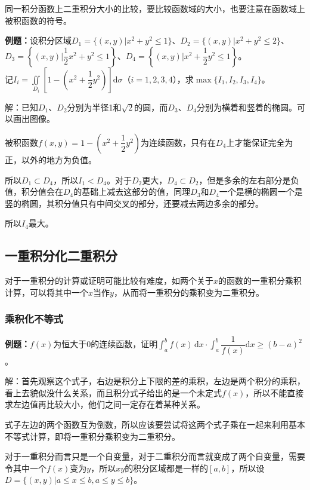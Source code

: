 \documentclass[UTF8, 12pt]{ctexart}
\begin{document}
同一积分函数上二重积分大小的比较，要比较函数域的大小，也要注意在函数域上被积函数的符号。

\textbf{例题：}设积分区域$D_1=\{(x,y)|x^2+y^2\leqslant1\}$、$D_2=\{(x,y)|x^2+y^2\leqslant2\}$、$D_3=\left\{(x,y)|\dfrac{1}{2}x^2+y^2\leqslant1\right\}$、$D_4=\left\{(x,y)|x^2+\dfrac{1}{2}y^2\leqslant1\right\}$。\\记$I_i=\iint\limits_{D_i}\left[1-\left(x^2+\dfrac{1}{2}y^2\right)\right]\textrm{d}\sigma$（$i=1,2,3,4$），求$\max\{I_1,I_2,I_3,I_4\}$。

解：已知$D_1$、$D_2$分别为半径1和$\sqrt{2}$的圆，而$D_3$、$D_4$分别为横着和竖着的椭圆。可以画出图像。

被积函数$f(x,y)=1-\left(x^2+\dfrac{1}{2}y^2\right)$为连续函数，只有在$D_4$上才能保证完全为正，以外的地方为负值。

所以$D_1\subset D_4$，所以$I_1<D_4$。对于$D_2$更大，$D_4\subset D_2$，但是多余的左右部分是负值，积分值会在$D_4$的基础上减去这部分的值，同理$D_3$和$D_4$一个是横的椭圆一个是竖的椭圆，其积分值只有中间交叉的部分，还要减去两边多余的部分。

所以$I_4$最大。

\subsection{一重积分化二重积分}

对于一重积分的计算或证明可能比较有难度，如两个关于$x$的函数的一重积分乘积计算，可以将其中一个$x$当作$y$，从而将一重积分的乘积变为二重积分。

\subsubsection{乘积化不等式}

\textbf{例题：}$f(x)$为恒大于0的连续函数，证明$\displaystyle{\int_a^bf(x)\,\textrm{d}x\cdot\int_a^b\dfrac{1}{f(x)}\textrm{d}x\geqslant(b-a)^2}$。

解：首先观察这个式子，右边是积分上下限的差的乘积，左边是两个积分的乘积，看上去貌似没什么关系，而且积分式子给出的是一个未定式$f(x)$，所以不能直接求左边值再比较大小，他们之间一定存在着某种关系。

式子左边的两个函数互为倒数，所以应该要尝试将这两个式子乘在一起来利用基本不等式计算，即将一重积分乘积变为二重积分。

对于一重积分而言只是一个自变量，对于二重积分而言就变成了两个自变量，需要令其中一个$f(x)$变为$y$，所以$xy$的积分区域都是一样的$[a,b]$，所以设$D=\{(x,y)\vert a\leqslant x\leqslant b,a\leqslant y\leqslant b\}$。
\end{document}
